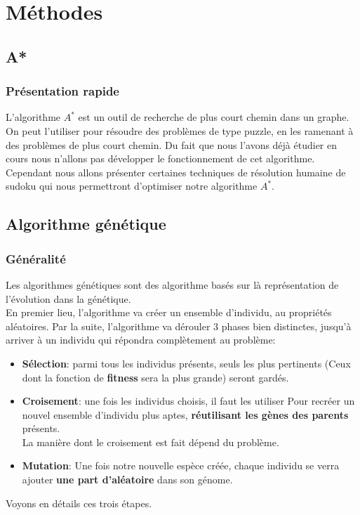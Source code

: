 \chapter{Méthodes}
    \section{A*}
        \subsection{Présentation rapide}
            L'algorithme $A^*$ est un outil de recherche de plus court chemin dans un graphe. On peut l'utiliser pour résoudre des problèmes de type puzzle, en les ramenant à des problèmes de plus court chemin.
            Du fait que nous l'avons déjà étudier en cours nous n'allons pas développer le fonctionnement de cet algorithme. Cependant nous allons présenter certaines techniques de résolution humaine de sudoku qui nous permettront d'optimiser notre algorithme $A^*$.\\ 
    \section{Algorithme génétique}
        \subsection{Généralité}
            Les algorithmes génétiques sont des algorithme basés sur là représentation de l'évolution dans la génétique.\\
            En premier lieu, l'algorithme va créer un ensemble d'individu, au propriétés aléatoires.
            Par la suite, l'algorithme va dérouler 3 phases bien distinctes, jusqu'à arriver à un individu qui répondra complètement au problème: 
            \begin{itemize}
                \item \textbf{Sélection}: parmi tous les individus présents, seuls les plus pertinents (Ceux dont la fonction de \textbf{fitness} sera la plus grande) seront gardés.
                \item \textbf{Croisement}: une fois les individus choisis, il faut les utiliser Pour recréer un nouvel ensemble d'individu plus aptes, \textbf{réutilisant les gènes des parents} présents.\\
                    La manière dont le croisement est fait dépend du problème.
                \item \textbf{Mutation}: Une fois notre nouvelle espèce créée, chaque individu se verra ajouter \textbf{une part d'aléatoire} dans son génome.
            \end{itemize}
            Voyons en détails ces trois étapes.
